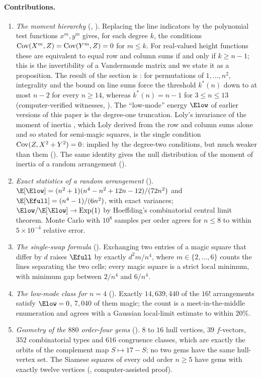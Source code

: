 \paragraph{Contributions.}
\begin{enumerate}\setlength\itemsep{1pt}
\item \emph{The moment hierarchy} (, ). Replacing the line indicators by the polynomial test functions $x^m,y^m$ gives, for each degree $k$, the conditions $\mathrm{Cov}(X^m,Z)=\mathrm{Cov}(Y^m,Z)=0$ for $m\le k$. For real-valued height functions these are equivalent to equal row and column sums if and only if $k\ge n-1$; this is the invertibility of a Vandermonde matrix and we state it as a proposition. The result of the section is : for permutations of $1,\dots,n^2$, integrality and the bound on line sums force the threshold $k^*(n)$ down to at most $n-2$ for every $n\ge14$, whereas $k^*(n)=n-1$ for $3\le n\le13$ (computer-verified witnesses, ). The ``low-mode'' energy $\Elow$ of earlier versions of this paper is the degree-one truncation. Loly's invariance of the moment of inertia \cite{loly2004invariance}, which Loly derived from the row and column sums alone and so stated for semi-magic squares, is the single condition $\mathrm{Cov}(Z,X^2+Y^2)=0$: implied by the degree-two conditions, but much weaker than them (). The same identity gives the null distribution of the moment of inertia of a random arrangement ().
\item \emph{Exact statistics of a random arrangement} (). $\E[\Elow]=(n^2+1)(n^4-n^2+12n-12)/(72n^2)$ and $\E[\Efull]=(n^4-1)/(6n^2)$, with exact variances; $\Elow/\E[\Elow]\to\mathrm{Exp}(1)$ by Hoeffding's combinatorial central limit theorem. Monte Carlo with $10^8$ samples per order agrees for $n\le 8$ to within $5\times10^{-4}$ relative error.
\item \emph{The single-swap formula} (). Exchanging two entries of a magic square that differ by $d$ raises $\Efull$ by exactly $d^2m/n^4$, where $m\in\{2,\dots,6\}$ counts the lines separating the two cells; every magic square is a strict local minimum, with minimum gap between $2/n^4$ and $6/n^4$.
\item \emph{The low-mode class for $n=4$} (). Exactly $14{,}639{,}440$ of the $16!$ arrangements satisfy $\Elow=0$, $7{,}040$ of them magic; the count is a meet-in-the-middle enumeration and agrees with a Gaussian local-limit estimate to within $20\%$.
\item \emph{Geometry of the $880$ order-four gems} (). $8$ to $16$ hull vertices, $39$ $f$-vectors, $352$ combinatorial types and $616$ congruence classes, which are exactly the orbits of the complement map $S\mapsto17-S$; no two gems have the same hull-vertex set. The Siamese squares of every odd order $n\ge5$ have gems with exactly twelve vertices (, computer-assisted proof).
\end{enumerate}

